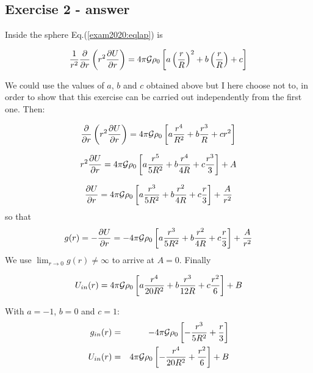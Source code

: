 \subsection*{Exercise 2 - answer}

Inside the sphere Eq.(\ref{exam2020:eqlap}) is

\begin{equation}
\frac{1}{r^2} \frac{\partial}{\partial r} \left( r^2 \frac{\partial U}{\partial r} \right) = 4 \pi {\cal G} 
\rho_0 \left[ a \left(\frac{r}{R}\right)^2+ b \left(\frac{r}{R}\right) + c \right]  \nonumber
\end{equation}

We could use the values of $a$, $b$ and $c$ obtained above but I here choose not to, in order to show that 
this exercise can be carried out independently from the first one. Then: 

\begin{equation}
\frac{\partial}{\partial r} \left( r^2 \frac{\partial U}{\partial r} \right) = 4 \pi {\cal G} 
\rho_0 \left[ a \frac{r^4}{R^2}+ b \frac{r^3}{R} + c r^2 \right] \nonumber
\end{equation}

\begin{equation}
r^2 \frac{\partial U}{\partial r} = 4 \pi {\cal G} \rho_0 \left[ a \frac{r^5}{5R^2}+ b \frac{r^4}{4R} + c \frac{r^3}{3} \right] + A  \nonumber
\end{equation}

\begin{equation}
\frac{\partial U}{\partial r} = 4 \pi {\cal G} \rho_0 \left[ a \frac{r^3}{5R^2}+ b \frac{r^2}{4R} + c \frac{r}{3} \right] + \frac{A}{r^2} \nonumber
\end{equation}
so that 
\begin{equation}
g(r)=-\frac{\partial U}{\partial r} = -4 \pi {\cal G} \rho_0 \left[ a \frac{r^3}{5R^2}+ b \frac{r^2}{4R} + c \frac{r}{3} \right] + \frac{A}{r^2} \nonumber
\end{equation}
We use $\lim_{r\rightarrow 0} g(r) \neq \infty$ to arrive at $A=0$.
Finally 

\begin{equation}
U_{in}(r) = 4 \pi {\cal G} \rho_0 \left[ a \frac{r^4}{20R^2}+ b \frac{r^3}{12R} + c \frac{r^2}{6} \right] + B \nonumber
\end{equation}

With $a=-1$, $b=0$ and $c=1$:
\begin{eqnarray}
g_{in}(r) &=&  -4 \pi {\cal G} \rho_0 \left[ - \frac{r^3}{5R^2}+   \frac{r}{3} \right]  \nonumber\\
U_{in}(r) &=& 4 \pi {\cal G} \rho_0 \left[ - \frac{r^4}{20R^2} +  \frac{r^2}{6} \right] + B  \nonumber
\end{eqnarray}

